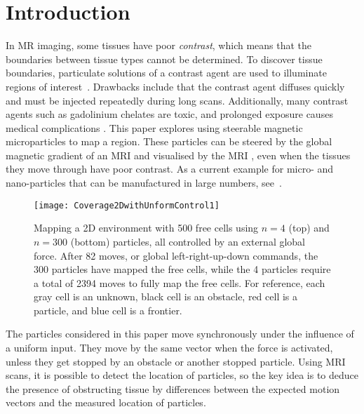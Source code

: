 \section{Introduction}\label{sec:Intro}
In MR imaging, some tissues have poor \emph{contrast}, which means that the boundaries between tissue types cannot be determined.
 To discover tissue boundaries, particulate solutions of a contrast agent are used to illuminate regions of interest~\cite{na2009inorganic}. 
 Drawbacks include that the contrast agent diffuses quickly and must be injected repeatedly during long scans. 
 Additionally, many contrast agents such as gadolinium chelates are toxic, and prolonged exposure causes medical complications \cite{caravan1999gadolinium}. 
This paper explores using steerable magnetic microparticles to map a region. 
These particles can be steered by the global magnetic gradient of an MRI and visualised by the MRI \cite{Vartholomeos2012}, even when the tissues they move through  have poor contrast.
As a current example for micro- and nano-particles that can be manufactured in large numbers, see~\cite{Chowdhury2015,martel2014computer,kim2015imparting,Donald2013,Ghosh2009,Ou2013,qiu2015magnetic}.

\begin{figure}
\begin{center}
	\texttt{[image: Coverage2DwithUnformControl1]}
\end{center}
\caption{\label{fig:Coverage2DwithUnformControl}
Mapping a 2D environment with 500 free cells using $n=4$ (top) and $n=300$ (bottom) particles, all controlled by an external global force. After 82 moves, or global left-right-up-down commands, the 300 particles have mapped the free cells, while the 4 particles require a total of 2394 moves to fully map the free cells. For reference, each gray cell is an unknown, black cell is an obstacle, red cell is a particle, and blue cell is a frontier.
}
\end{figure}

The particles considered in this paper move synchronously under the influence of a uniform input.
They move by the same vector when the force is activated,
unless they get stopped by an obstacle or another stopped particle.  
Using MRI scans, it is possible to detect the location of particles, so the key idea is to deduce the presence of obstructing tissue by differences between the expected motion vectors and 
the measured location of particles.

